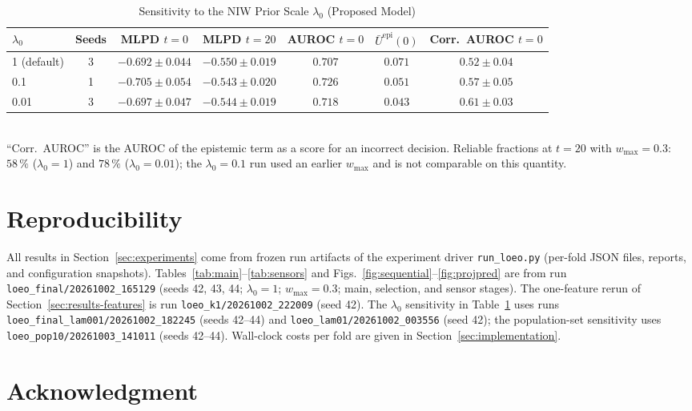 \documentclass[lettersize,journal]{IEEEtran}
\newif\ifdraftnotes
\newcommand{\draftnote}[1]{\ifdraftnotes\textcolor{red}{\textbf{[TODO: #1]}}\fi}
\begin{document}
\begin{table}[t]
\caption{Sensitivity to the NIW Prior Scale $\lambda_0$ (Proposed Model)}
\label{tab:lambda}
\centering
\setlength{\tabcolsep}{3.5pt}
\footnotesize
\begin{tabular}{lcccccc}
\toprule
$\lambda_0$ & Seeds & MLPD $t{=}0$ & MLPD $t{=}20$ & AUROC $t{=}0$ & $\bar U^{\mathrm{epi}}(0)$ & Corr.\ AUROC $t{=}0$ \\
\midrule
1 (default) & 3 & $-0.692\pm0.044$ & $-0.550\pm0.019$ & $0.707$ & $0.071$ & $0.52\pm0.04$ \\
0.1         & 1 & $-0.705\pm0.054$ & $-0.543\pm0.020$ & $0.726$ & $0.051$ & $0.57\pm0.05$ \\
0.01        & 3 & $-0.697\pm0.047$ & $-0.544\pm0.019$ & $0.718$ & $0.043$ & $0.61\pm0.03$ \\
\bottomrule
\end{tabular}
\\[2pt]
{\footnotesize ``Corr.\ AUROC'' is the AUROC of the epistemic term as a score for an incorrect decision. Reliable fractions at $t=20$ with $w_{\max}=0.3$: $58\,\%$ ($\lambda_0=1$) and $78\,\%$ ($\lambda_0=0.01$); the $\lambda_0=0.1$ run used an earlier $w_{\max}$ and is not comparable on this quantity.}
\end{table}

\section{Reproducibility}
\label{app:repro}

All results in Section~\ref{sec:experiments} come from frozen run artifacts of the experiment driver \texttt{run\_loeo.py} (per-fold JSON files, reports, and configuration snapshots). Tables~\ref{tab:main}--\ref{tab:sensors} and Figs.~\ref{fig:sequential}--\ref{fig:projpred} are from run \texttt{loeo\_final/20261002\_165129} (seeds 42, 43, 44; $\lambda_0=1$; $w_{\max}=0.3$; main, selection, and sensor stages). The one-feature rerun of Section~\ref{sec:results-features} is run \texttt{loeo\_k1/20261002\_222009} (seed 42). The $\lambda_0$ sensitivity in Table~\ref{tab:lambda} uses runs \texttt{loeo\_final\_lam001/20261002\_182245} (seeds 42--44) and \texttt{loeo\_lam01/20261002\_003556} (seed 42); the population-set sensitivity uses \texttt{loeo\_pop10/20261003\_141011} (seeds 42--44). Wall-clock costs per fold are given in Section~\ref{sec:implementation}. \draftnote{Add hardware, operating system, and Python package versions.}

\section*{Acknowledgment}
\draftnote{Funding, data-collection acknowledgments, conflicts of interest, and the ethics and consent statement.}




\ifdraftnotes
\vspace{1ex}
\noindent\draftnote{Add IEEE-format author biographies and photographs for the final files.}
\fi
\end{document}
